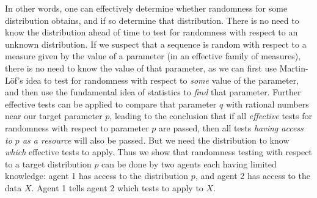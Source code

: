 In other words, one can effectively determine whether randomness for some distribution obtains, and if so determine that distribution. {There is no need to know the distribution ahead of time to test for randomness with respect to an unknown distribution.} %
If we suspect that a sequence is random with respect to a measure given by the value of a parameter (in an effective family of measures), there is no need to know the value of that parameter, as we can first use Martin-L\"of's idea to test for randomness with respect to \emph{some} value of the parameter, and then use the fundamental idea of statistics to \emph{find} that parameter.   Further effective tests can be applied to compare that parameter $q$ with rational numbers near our target parameter $p$, leading to the conclusion that {if all \emph{effective} tests for randomness with respect to parameter $p$ are passed, then all tests \emph{having access to $p$ as a resource} will also be passed}. But we need the distribution to know \emph{which} effective tests to apply. Thus we show that randomness testing with respect to a target distribution $p$ can be done by two agents each having limited knowledge: agent 1 has access to the distribution $p$, and agent 2 has access to the data $X$. Agent 1 tells agent 2 which tests to apply to $X$. %


